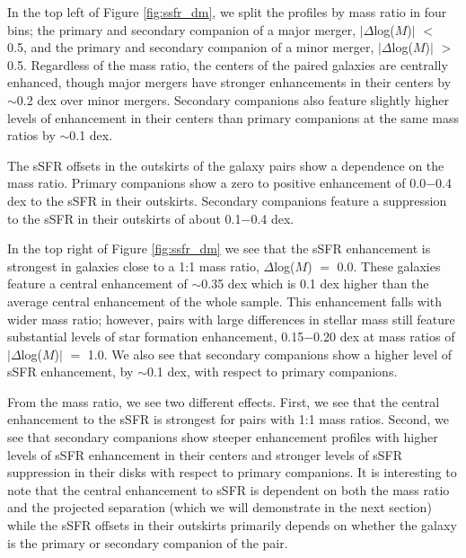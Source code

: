 \documentclass[iop,revtex4,twocolumn,apj,numberedappendix,appendixfloats]{emulateapj}
\newcommand{\logm}{log($M/M_{\odot}$)}
\begin{document}
In the top left of Figure \ref{fig:ssfr_dm}, we split the profiles by mass ratio in four bins; the primary and secondary companion of a major merger, $|\Delta$log($M$)$|$ $<$ 0.5, and the primary and secondary companion of a minor merger, $|\Delta$log($M$)$|$ $>$ 0.5. Regardless of the mass ratio, the centers of the paired galaxies are centrally enhanced, though major mergers have stronger enhancements in their centers by $\sim$0.2 dex over minor mergers. Secondary companions also feature slightly higher levels of enhancement in their centers than primary companions at the same mass ratios by $\sim$0.1 dex. 

The sSFR offsets in the outskirts of the galaxy pairs show a dependence on the mass ratio. Primary companions show a zero to positive enhancement of 0.0$-$0.4 dex to the sSFR in their outskirts. Secondary companions feature a suppression to the sSFR in their outskirts of about 0.1$-$0.4 dex. 

In the top right of Figure \ref{fig:ssfr_dm} we see that the sSFR enhancement is strongest in galaxies close to a 1:1 mass ratio, $\Delta$log($M$) $=$ 0.0. These galaxies feature a central enhancement of $\sim$0.35 dex which is 0.1 dex higher than the average central enhancement of the whole sample. This enhancement falls with wider mass ratio; however, pairs with large differences in stellar mass still feature substantial levels of star formation enhancement, 0.15$-$0.20 dex at mass ratios of $|\Delta$log($M$)$|$ $=$ 1.0. We also see that secondary companions show a higher level of sSFR enhancement, by $\sim$0.1 dex, with respect to primary companions. 


From the mass ratio, we see two different effects. First, we see that the central enhancement to the sSFR is strongest for pairs with 1:1 mass ratios. Second, we see that secondary companions show steeper enhancement profiles with higher levels of sSFR enhancement in their centers and stronger levels of sSFR suppression in their disks with respect to primary companions. It is interesting to note that the central enhancement to sSFR is dependent on both the mass ratio and the projected separation (which we will demonstrate in the next section) while the sSFR offsets in their outskirts primarily depends on whether the galaxy is the primary or secondary companion of the pair.
\end{document}
